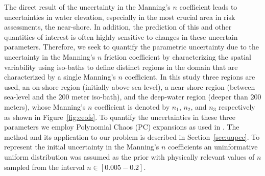 The direct result of the uncertainty in the Manning's $n$ coefficient leads to
uncertainties in water elevation,
especially in the most crucial area in risk assessments, the near-shore. In 
addition,  the prediction of this and other quantities of interest is often highly 
sensitive to changes in these uncertain parameters.  Therefore, we seek to 
quantify the parametric uncertainty due to the uncertainty in the Manning's $n$ 
friction coefficient by characterizing the spatial variability using
iso-baths to define distinct regions in the domain that are characterized by a
single Manning's $n$ coefficient.  In this study three regions are used, an
on-shore region (initially above sea-level), a near-shore region (between
sea-level and the 200 meter iso-bath), and the deep-water region (deeper than
200 meters), whose Manning's $n$ coefficient is denoted by $n_1$, $n_2$, and $n_3$ respectively 
as shown in Figure~\ref{fig:ceofs}. To quantify the uncertainties
in these three parameters we employ Polynomial Chaos (PC) 
expansions as used in \cite{sraj:2013a,sraj:2013b}.  The method and its 
application to our problem is
described in Section~\ref{sec:uqpce}.  To represent the initial uncertainty in the
Manning's $n$ coefficients an uninformative uniform distribution was assumed as 
the prior with physically relevant values of $n$ sampled from the interval 
$n \in [0.005-0.2]$.